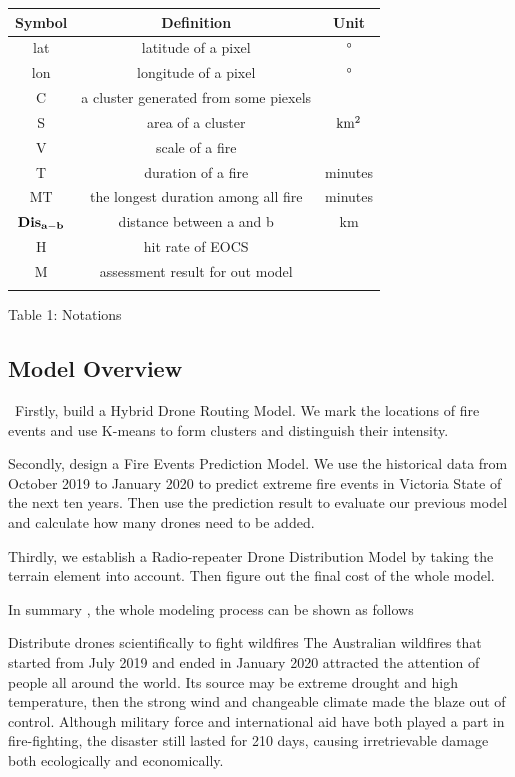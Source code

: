 \documentclass{mcmthesis}
\begin{document}
\begin{center}
\begin{tabular}{ccc}
	\hline
	Symbol & Definition & Unit\\
	\hline
	lat & latitude of a pixel & °\\
	lon & longitude of a pixel & °\\
	C	& a cluster generated from some piexels \\
	S   & area of a cluster & ${\rm km^2}$\\
	V   & scale of a fire \\
	T   & duration of a fire & minutes \\
	MT  & the longest duration among all fire & minutes\\
	${\bf Dis_{a-b}}$ & distance between a and b & km\\
	H   & hit rate of EOCS \\
	M   & assessment result for out model \\
	\hline
	\label{table:symbol}
\end{tabular}
\end{center}
\begin{center}
	Table 1: Notations
\end{center}

\subsection{Model Overview}

\quad \, Firstly, build a Hybrid Drone Routing Model. We mark the locations of fire events and use K-means to form clusters and distinguish their intensity. 

Secondly, design a Fire Events Prediction Model. We use the historical data from October 2019 to January 2020 to predict extreme fire events in Victoria State of the next ten years. Then use the prediction result to evaluate our previous model and calculate how many drones need to be added.

Thirdly, we establish a Radio-repeater Drone Distribution Model by taking the terrain element into account. Then figure out the final cost of the whole model.

In summary , the whole modeling process can be shown as follows

Distribute drones scientifically to fight wildfires
The Australian wildfires that started from July 2019 and ended in January 2020 attracted the attention of people all around the world. Its source may be extreme drought and high temperature, then the strong wind and changeable climate made the blaze out of control. Although military force and international aid have both played a part in fire-fighting, the disaster still lasted for 210 days, causing irretrievable damage both ecologically and economically. 
\end{document}
